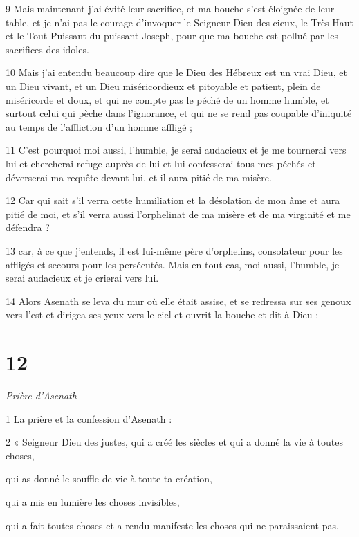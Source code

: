 \par 9 Mais maintenant j'ai évité leur sacrifice, et ma bouche s'est éloignée de leur table, et je n'ai pas le courage d'invoquer le Seigneur Dieu des cieux, le Très-Haut et le Tout-Puissant du puissant Joseph, pour que ma bouche est pollué par les sacrifices des idoles.

\par 10 Mais j'ai entendu beaucoup dire que le Dieu des Hébreux est un vrai Dieu, et un Dieu vivant, et un Dieu miséricordieux et pitoyable et patient, plein de miséricorde et doux, et qui ne compte pas le péché de un homme humble, et surtout celui qui pèche dans l'ignorance, et qui ne se rend pas coupable d'iniquité au temps de l'affliction d'un homme affligé ;

\par 11 C'est pourquoi moi aussi, l'humble, je serai audacieux et je me tournerai vers lui et chercherai refuge auprès de lui et lui confesserai tous mes péchés et déverserai ma requête devant lui, et il aura pitié de ma misère.

\par 12 Car qui sait s'il verra cette humiliation et la désolation de mon âme et aura pitié de moi, et s'il verra aussi l'orphelinat de ma misère et de ma virginité et me défendra ?

\par 13 car, à ce que j'entends, il est lui-même père d'orphelins, consolateur pour les affligés et secours pour les persécutés. Mais en tout cas, moi aussi, l'humble, je serai audacieux et je crierai vers lui.

\par 14 Alors Asenath se leva du mur où elle était assise, et se redressa sur ses genoux vers l'est et dirigea ses yeux vers le ciel et ouvrit la bouche et dit à Dieu :

\chapter{12}

\par \textit{Prière d'Asenath}

\par 1 La prière et la confession d'Asenath :

\par 2 « Seigneur Dieu des justes, qui a créé les siècles et qui a donné la vie à toutes choses,
\par qui as donné le souffle de vie à toute ta création,
\par qui a mis en lumière les choses invisibles,
\par qui a fait toutes choses et a rendu manifeste les choses qui ne paraissaient pas,

